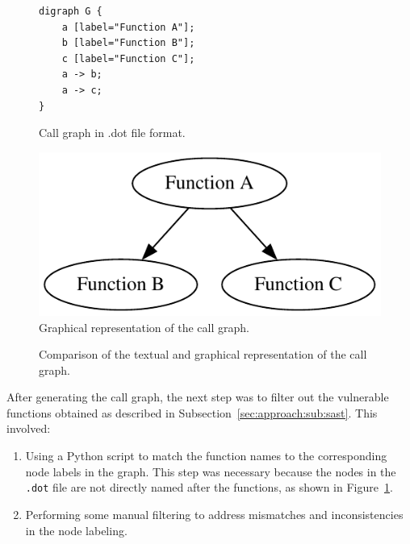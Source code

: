 \begin{figure}[ht]
    \centering
    \begin{minipage}[t]{0.45\textwidth}
        \vspace{0pt} %
        \begin{lstlisting}
digraph G {
    a [label="Function A"];
    b [label="Function B"];
    c [label="Function C"];
    a -> b;
    a -> c;
}
        \end{lstlisting}
        \vspace{0.5em} %
        {\footnotesize Call graph in .dot file format.} %
    \end{minipage}
    \hfill
    \begin{minipage}[t]{0.45\textwidth}
        \vspace{0pt} %
        \centering
        \includegraphics[width=\textwidth]{figures/callgraph.pdf}
        \vspace{0.5em} %
        {\footnotesize Graphical representation of the call graph.} %
    \end{minipage}
    \caption{Comparison of the textual and graphical representation of the call graph.}
    \label{callgraph}
\end{figure}

After generating the call graph, the next step was to filter out the vulnerable functions obtained as described in Subsection~\ref{sec:approach:sub:sast}. This involved:
\begin{enumerate}
    \item Using a Python script to match the function names to the corresponding node labels in the graph. This step was necessary because the nodes in the \texttt{.dot} file are not directly named after the functions, as shown in Figure~\ref{callgraph}.
    \item Performing some manual filtering to address mismatches and inconsistencies in the node labeling.
\end{enumerate}

